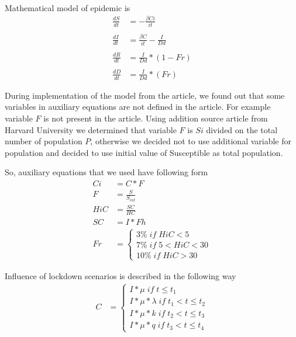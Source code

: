 \documentclass[12pt,a4paper,english]{article}
\begin{document}
    Mathematical model of epidemic is
    \begin{subequations} \label{eq:quations}
        \begin{align*} 
            \frac{dS}{dt} &= - \frac{\beta Ci}{it}  \\ \\
            \frac{dI}{dt} &= \frac{\beta C}{it} - \frac{I}{Dd}\\ \\ %
            \frac{dR}{dt} &= \frac{I}{Dd} * (1 - Fr)\\ \\
            \frac{dD}{dt} &= \frac{I}{Dd} * (Fr)
        \end{align*}
    \end{subequations}

    During implementation of the model from the article, we found out that some variables in auxiliary equations are not defined in the article. 
    For example variable $F$ is not present in the article. 
    Using addition source article from Harvard University \cite{Harvard} we determined that variable $F$ is $Si$ divided on the total number of population $P$, otherwise we decided not to use additional variable for population and decided to use
    initial value of Susceptible as total population. 
    
    So, auxiliary equations that we used have following form
    \begin{subequations}
        \begin{align*} 
            Ci  &= C *F \\
            F   &= \frac{S}{S_{int}} \\ 
            HiC &= \frac{SC}{HC} \\
            SC  &= I * Fh \\
            Fr  &=    
            \begin{cases}
                3\% \; if \; HiC < 5 \\
                7\% \; if \; 5 < HiC < 30 \\
                10\% \; if \; HiC > 30
            \end{cases}
        \end{align*}
    \end{subequations}

    Influence of lockdown scenarios is described in the following way
    \begin{subequations}
        \begin{align*} 
            C  &=    
            \begin{cases}
                I * \mu \; if \; t \leq  t_1 \\
                I * \mu * \lambda \; if \; t_1 < t \leq t_2 \\
                I * \mu * k \; if \; t_2 < t \leq t_3 \\
                I * \mu * q \; if \; t_3 < t \leq t_4
            \end{cases}
        \end{align*}
    \end{subequations}
\end{document}
